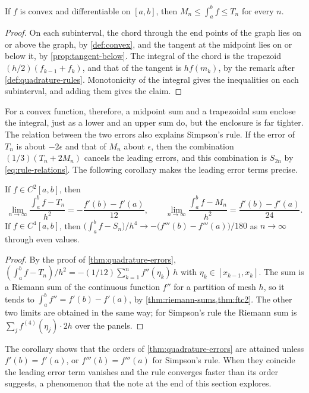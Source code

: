 \begin{proposition}
\label{prop:convex-quadrature}
If $f$ is convex and differentiable on $[a,b]$, then $M_n\le\int_a^bf\le T_n$ for every $n$.
\end{proposition}

\begin{proof}
On each subinterval, the chord through the end points of the graph lies on or above the graph, by \cref{def:convex}, and the tangent at the midpoint lies on or below it, by \cref{prop:tangent-below}. The integral of the chord is the trapezoid $(h/2)(f_{k-1}+f_k)$, and that of the tangent is $hf(m_k)$, by the remark after \cref{def:quadrature-rules}. Monotonicity of the integral gives the inequalities on each subinterval, and adding them gives the claim.
\end{proof}

For a convex function, therefore, a midpoint sum and a trapezoidal sum enclose the integral, just as a lower and an upper sum do, but the enclosure is far tighter. The relation between the two errors also explains Simpson's rule. If the error of $T_n$ is about $-2\epsilon$ and that of $M_n$ about $\epsilon$, then the combination $(1/3)(T_n+2M_n)$ cancels the leading errors, and this combination is $S_{2n}$ by \eqref{eq:rule-relations}. The following corollary makes the leading error terms precise.

\begin{corollary}
\label{cor:asymptotic-errors}
If $f\in C^2[a,b]$, then
\[
\lim_{n\to\infty}\frac{\int_a^bf-T_n}{h^2}=-\frac{f'(b)-f'(a)}{12},\qquad\lim_{n\to\infty}\frac{\int_a^bf-M_n}{h^2}=\frac{f'(b)-f'(a)}{24} .
\]
If $f\in C^4[a,b]$, then $\bigl(\int_a^bf-S_n\bigr)/h^4\to-\bigl(f'''(b)-f'''(a)\bigr)/180$ as $n\to\infty$ through even values.
\end{corollary}

\begin{proof}
By the proof of \cref{thm:quadrature-errors}, $(\int_a^bf-T_n)/h^2=-(1/12)\sum_{k=1}^nf''(\eta_k)\,h$ with $\eta_k\in[x_{k-1},x_k]$. The sum is a Riemann sum of the continuous function $f''$ for a partition of mesh $h$, so it tends to $\int_a^bf''=f'(b)-f'(a)$, by \cref{thm:riemann-sums,thm:ftc2}. The other two limits are obtained in the same way; for Simpson's rule the Riemann sum is $\sum_jf^{(4)}(\eta_j)\cdot2h$ over the panels.
\end{proof}

The corollary shows that the orders of \cref{thm:quadrature-errors} are attained unless $f'(b)=f'(a)$, or $f'''(b)=f'''(a)$ for Simpson's rule. When they coincide the leading error term vanishes and the rule converges faster than its order suggests, a phenomenon that the note at the end of this section explores.

